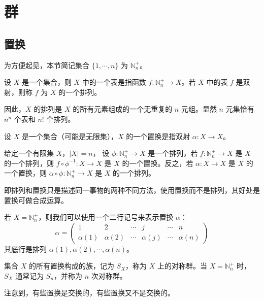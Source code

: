 \chapter{群}

\section{置换}

\newcommand{\NNn}{\mathbb{N}_n^{+}}

为方便起见，本节简记集合 $\{1,\cdots,n\}$ 为 $\NNn$。

\begin{definition}
	设 $X$ 是一个集合，则 $X$ 中的一个表是指函数 $f:\NNn \to X$。若 $X$ 中的表 $f$ 是双射，则称 $f$ 为 $X$ 的一个排列。
\end{definition}

因此，$X$ 的排列是 $X$ 的所有元素组成的一个无重复的 $n$ 元组。显然 $n$ 元集恰有 $n^n$ 个表和 $n!$ 个排列。

\begin{definition}[置换]
	设 $X$ 是一个集合（可能是无限集），$X$ 的一个置换是指双射 $\alpha : X \to X$。
\end{definition}

给定一个有限集 $X$，$|X|=n$， 设 $\phi : \NNn \to X$ 是一个排列，若 $f : \NNn \to X$ 是 $X$ 的一个排列，则 $f \circ \phi^{-1} : X \to X$ 是 $X$ 的一个置换。反之，若 $\alpha : X \to X$ 是 $X$ 的一个置换，则 $\alpha \circ \phi : \NNn \to X$ 是 $X$ 的一个排列。

即排列和置换只是描述同一事物的两种不同方法，使用置换而不是排列，其好处是置换可做合成运算。

若 $X = \NNn$，则我们可以使用一个二行记号来表示置换 $\alpha$：
\[\alpha = \left(\begin{matrix}
			1         & 2         & \cdots & j         & \cdots & n          \\
			\alpha(1) & \alpha(2) & \cdots & \alpha(j) & \cdots & \alpha(n)
		\end{matrix}\right)\]
其底行是排列 $\alpha(1) , \alpha(2) , \cdots , \alpha(n)$。

\begin{definition}[对称群]
	集合 $X$ 的所有置换构成的族，记为 $S_X$，称为 $X$ 上的对称群。当 $X = \NNn$ 时， $S_X$ 通常记为 $S_n$，并称为 $n$ 次对称群。
\end{definition}

注意到，有些置换是交换的，有些置换又不是交换的。







\let\NNn\relax
